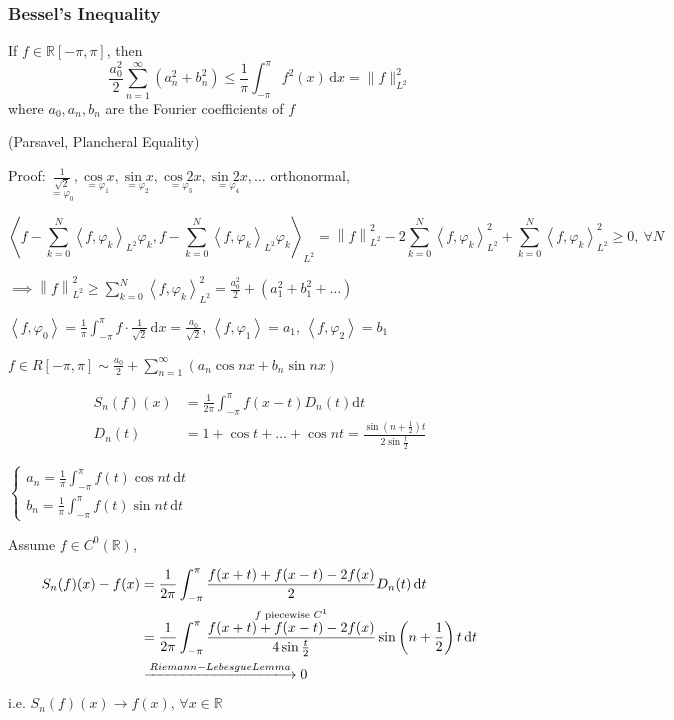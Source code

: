 \subsubsection[Bessel (贝塞尔) 不等式]{Bessel's Inequality}

If $f\in\mathbb{R}[-\pi,\pi]$, then
$$\frac{a_0^2}{2}\sum_{n=1}^{\infty}\left(a_n^2+b_n^2\right)\leq\frac{1}{\pi}\int_{-\pi}^{\pi}f^2(x)\,\mathrm{d}x=\|f\|^2_{L^2}$$
where $a_0,a_n,b_n$ are the Fourier coefficients of $f$

(Parsavel, Plancheral Equality)

Proof: $\underset{=\varphi_0}{\frac{1}{\sqrt{2}}},\underset{=\varphi_1}{\cos x},\underset{=\varphi_2}{\sin x},\underset{=\varphi_3}{\cos 2x},\underset{=\varphi_4}{\sin 2x},\dots$ orthonormal,

$$\left<f-\sum_{k=0}^N\left<f,\varphi_k\right>_{L^2}\varphi_k,f-\sum_{k=0}^N\left<f,\varphi_k\right>_{L^2}\varphi_k\right>_{L^2}=\left\|f\right\|_{L^2}^2-2\sum_{k=0}^N\left<f,\varphi_k\right>_{L^2}^2+\sum_{k=0}^N\left<f,\varphi_k\right>_{L^2}^2\geq 0,\ \forall N$$

$\implies\left\|f\right\|_{L^2}^2\geq\sum_{k=0}^N\left<f,\varphi_k\right>_{L^2}^2=\frac{a_0^2}{2}+\left(a_1^2+b_1^2+\dots\right)$

$\left<f,\varphi_0\right>=\frac{1}{\pi}\int_{-\pi}^{\pi}f\cdot\frac{1}{\sqrt{2}}\,\mathrm{d}x=\frac{a_0}{\sqrt{2}}$, $\left<f,\varphi_1\right>=a_1$, $\left<f,\varphi_2\right>=b_1$


$f\in R[-\pi,\pi]\sim\frac{a_0}{2}+\sum_{n=1}^{\infty}\left(a_n\cos nx+b_n\sin nx\right)$

\begin{align*}
    S_n(f)(x) & =\frac{1}{2\pi}\int_{-\pi}^{\pi}f(x-t)D_n(t)\mathrm{d}t                          \\
    D_n(t)    & =1+\cos t+\dots+\cos nt=\frac{\sin\left(n+\frac{1}{2}\right)t}{2\sin\frac{t}{2}}
\end{align*}

$\begin{cases}
        a_n=\frac{1}{\pi}\int_{-\pi}^{\pi}f(t)\cos nt\,\mathrm{d}t \\
        b_n=\frac{1}{\pi}\int_{-\pi}^{\pi}f(t)\sin nt\,\mathrm{d}t
    \end{cases}$

Assume $f\in C^0(\mathbb{R})$,

\begin{align*}
    S_n(f)(x)-f(x)
     & =\frac{1}{2\pi}\int_{-\pi}^{\pi}\frac{f(x+t)+f(x-t)-2f(x)}{2}D_n(t)\,\mathrm{d}t                                                                           \\
     & =\frac{1}{2\pi}\int_{-\pi}^{\pi}\overset{f\text{ piecewise }C^1}{\frac{f(x+t)+f(x-t)-2f(x)}{4\sin\frac{t}{2}}}\sin\left(n+\frac{1}{2}\right)t\,\mathrm{d}t \\
     & \xlongrightarrow{Riemann-Lebesgue Lemma}0
\end{align*}
i.e. $S_n(f)(x)\to f(x)$, $\forall x\in\mathbb{R}$


